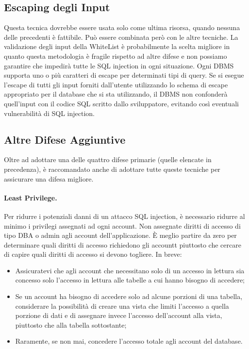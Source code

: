 \subsection{Escaping degli Input}

Questa tecnica dovrebbe essere usata solo come ultima risorsa,
quando nessuna delle
precedenti è fattibile. Può essere combinata però con le altre tecniche.
La validazione degli input della WhiteList è probabilmente la scelta migliore
in quanto questa
metodologia è fragile rispetto ad altre difese e non possiamo garantire che
impedirà tutte le
SQL injection in ogni situazione.
Ogni DBMS supporta uno o più caratteri di escape per determinati tipi di query.
Se si esegue
l'escape di tutti gli input forniti dall'utente utilizzando lo schema di escape
appropriato per il
database che si sta utilizzando, il DBMS non confonderà quell'input con il codice
SQL scritto
dallo sviluppatore, evitando così eventuali vulnerabilità di SQL injection.

\subsection{Altre Difese Aggiuntive}

Oltre ad adottare una delle quattro difese primarie (quelle elencate in precedenza),
è raccomandato anche di adottare tutte
queste tecniche per assicurare una difesa migliore.

\paragraph{Least Privilege.}
Per ridurre i potenziali danni di un attacco SQL injection, è necessario ridurre
al minimo i
privilegi assegnati ad ogni account. Non assegnate diritti di accesso di tipo DBA
o admin agli
account dell'applicazione. È meglio partire da zero per determinare quali diritti
di accesso
richiedono gli accountt piuttosto che cercare di capire quali diritti di accesso
si devono togliere.
In breve:

\begin{itemize}
    \item Assicuratevi che agli account che necessitano solo di un accesso in
          lettura sia
          concesso solo l'accesso in lettura alle tabelle a cui hanno bisogno di accedere;
    \item Se un account ha bisogno di accedere solo ad alcune porzioni di una
          tabella,
          considerare la possibilità di creare una vista che limiti l'accesso a quella
          porzione di
          dati e di assegnare invece l'accesso dell'account alla vista, piuttosto che
          alla tabella sottostante;
    \item Raramente, se non mai, concedere l'accesso totale agli account del
          database.
\end{itemize}

